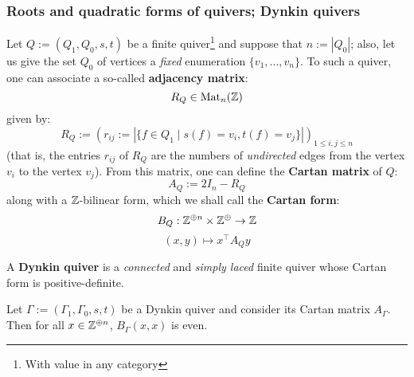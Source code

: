         \subsubsection{Roots and quadratic forms of quivers; Dynkin quivers}
            \begin{definition} \label{def: adjacency_and_cartan_matrices}
                Let $Q := (Q_1, Q_0, s, t)$ be a finite quiver\footnote{With value in any category} and suppose that $n := |Q_0|$; also, let us give the set $Q_0$ of vertices a \textit{fixed} enumeration $\{v_1, ..., v_n\}$. To such a quiver, one can associate a so-called \textbf{adjacency matrix}:
                    $$R_Q \in \mathrm{Mat}_n(\mathbb{Z})$$
                given by:
                    $$R_Q := (r_{ij} := |\{f \in Q_1 \mid s(f) = v_i, t(f) = v_j\}|)_{1 \leq i, j \leq n}$$
                (that is, the entries $r_{ij}$ of $R_Q$ are the numbers of \textit{undirected} edges from the vertex $v_i$ to the vertex $v_j$). From this matrix, one can define the \textbf{Cartan matrix} of $Q$:
                    $$A_Q := 2I_n - R_Q$$
                along with a $\mathbb{Z}$-bilinear form, which we shall call the \textbf{Cartan form}:
                    $$B_Q: \Z^{\oplus n} \x \Z^{\oplus} \to \Z$$
                    $$(x, y) \mapsto x^{\top} A_Q y$$                
            \end{definition}
            \begin{definition} \label{def: dynkin_quivers}
                A \textbf{Dynkin quiver} is a \textit{connected} and \textit{simply laced} finite quiver whose Cartan form is positive-definite.
            \end{definition}
            \begin{proposition}
                Let $\Gamma := (\Gamma_1, \Gamma_0, s, t)$ be a Dynkin quiver and consider its Cartan matrix $A_{\Gamma}$. Then for all $x \in \mathbb{Z}^{\oplus n}$, $B_{\Gamma}(x, x)$ is even.  
            \end{proposition}
